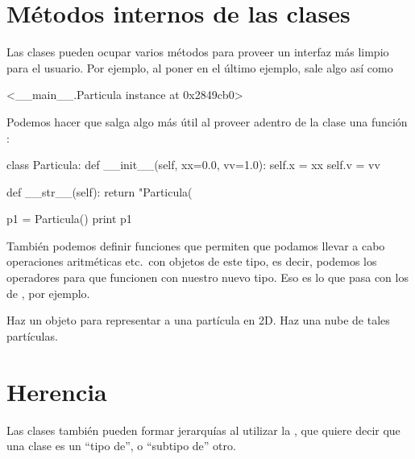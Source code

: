 \section{Métodos internos de las clases}
Las clases pueden ocupar varios métodos para proveer un interfaz más limpio para el usuario. Por ejemplo, al poner 
 en el último ejemplo, sale algo así como
\begin{python}
<__main__.Particula instance at 0x2849cb0>
\end{python}
Podemos hacer que salga algo más útil al proveer adentro de la clase una función :
\begin{python}
class Particula:
  def __init__(self, xx=0.0, vv=1.0):
    self.x = xx
    self.v = vv

  def __str__(self):
    return "Particula(%

p1 = Particula()
print p1
\end{python}

También podemos definir funciones que permiten que podamos llevar a cabo operaciones aritméticas etc.\ con objetos de este tipo, es decir, podemos  los operadores para que funcionen con nuestro nuevo tipo. Eso es lo que pasa con los  de , por ejemplo.

\ej Haz un objeto para representar a una partícula en 2D. Haz una nube de tales partículas.

\section{Herencia}
Las clases también pueden formar jerarquías al utilizar la , que quiere decir que una clase es un ``tipo de'', o ``subtipo de'' otro.
